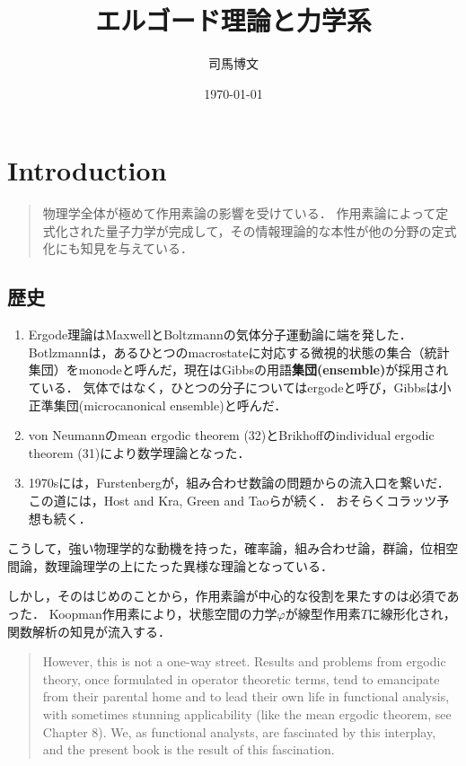 \documentclass[uplatex,dvipdfmx]{jsreport}
\title{エルゴード理論と力学系}
\author{司馬博文}
\date{\today}
\begin{document}
\mgfamily
\tableofcontents

\chapter{Introduction}

\begin{quotation}
    物理学全体が極めて作用素論の影響を受けている．
    作用素論によって定式化された量子力学が完成して，その情報理論的な本性が他の分野の定式化にも知見を与えている．
\end{quotation}

\section{歴史}

\begin{enumerate}
    \item Ergode理論はMaxwellとBoltzmannの気体分子運動論に端を発した．
    Botlzmannは，あるひとつのmacrostateに対応する微視的状態の集合（統計集団）をmonodeと呼んだ，現在はGibbsの用語\textbf{集団(ensemble)}が採用されている．
    気体ではなく，ひとつの分子についてはergodeと呼び，Gibbsは小正準集団(microcanonical ensemble)と呼んだ．
    \item von Neumannのmean ergodic theorem (32)とBrikhoffのindividual ergodic theorem (31)により数学理論となった．
    \item 1970sには，Furstenbergが，組み合わせ数論の問題からの流入口を繋いだ．
    この道には，Host and Kra, Green and Taoらが続く．
    おそらくコラッツ予想も続く．
\end{enumerate}

こうして，強い物理学的な動機を持った，確率論，組み合わせ論，群論，位相空間論，数理論理学の上にたった異様な理論となっている．

しかし，そのはじめのことから，作用素論が中心的な役割を果たすのは必須であった．
Koopman作用素により，状態空間の力学$\varphi$が線型作用素$T$に線形化され，関数解析の知見が流入する．

\begin{quote}
    However, this is not a one-way street. Results and problems from ergodic theory,
once formulated in operator theoretic terms, tend to emancipate from their parental
home and to lead their own life in functional analysis, with sometimes stunning
applicability (like the mean ergodic theorem, see Chapter 8). We, as functional
analysts, are fascinated by this interplay, and the present book is the result of this
fascination.\cite{OperatorTheoretic}
\end{quote}
\end{document}
